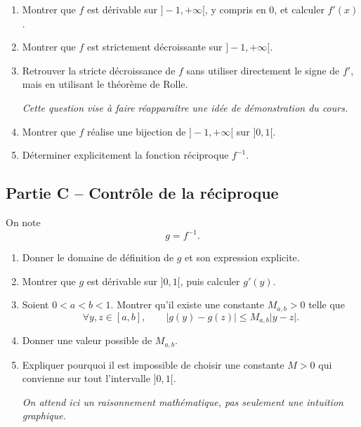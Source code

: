 \documentclass[11pt,a4paper]{article}
\begin{document}
\begin{enumerate}[resume]
    \item Montrer que \(f\) est dérivable sur \(]-1,+\infty[\), y compris en \(0\), et calculer \(f'(x)\).

    \item Montrer que \(f\) est strictement décroissante sur \(]-1,+\infty[\).

    \item Retrouver la stricte décroissance de \(f\) sans utiliser directement le signe de \(f'\), mais en utilisant le théorème de Rolle.

    \medskip

    \emph{Cette question vise à faire réapparaître une idée de démonstration du cours.}

    \item Montrer que \(f\) réalise une bijection de \(]-1,+\infty[\) sur \(]0,1[\).

    \item Déterminer explicitement la fonction réciproque \(f^{-1}\).
\end{enumerate}


\subsection*{Partie C -- Contrôle de la réciproque}

On note
\[
g=f^{-1}.
\]

\begin{enumerate}[resume]
    \item Donner le domaine de définition de \(g\) et son expression explicite.

    \item Montrer que \(g\) est dérivable sur \(]0,1[\), puis calculer \(g'(y)\).

    \item Soient \(0<a<b<1\). Montrer qu'il existe une constante \(M_{a,b}>0\) telle que
    \[
    \forall y,z\in[a,b],
    \qquad
    |g(y)-g(z)|\leq M_{a,b}|y-z|.
    \]

    \item Donner une valeur possible de \(M_{a,b}\).

    \item Expliquer pourquoi il est impossible de choisir une constante \(M>0\) qui convienne sur tout l'intervalle \(]0,1[\).

    \medskip

    \emph{On attend ici un raisonnement mathématique, pas seulement une intuition graphique.}
\end{enumerate}
\end{document}
